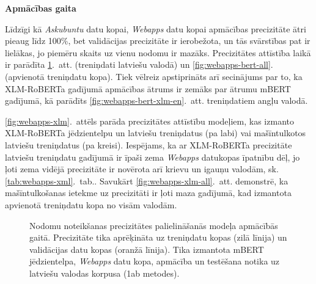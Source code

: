 \textbf{Apmācības gaita}

Līdzīgi kā \textit{Askubuntu} datu kopai, \textit{Webapps} datu kopai apmācības precizitāte ātri pieaug līdz 100\%, bet validācijas precizitāte ir ierobežota, un tās svārstības pat ir lielākas, jo piemēru skaits uz vienu nodomu ir mazāks. 
Precizitātes attīstība laikā ir parādīta \ref{fig:webapps-bert}.~att. (treniņdati latviešu valodā) un \ref{fig:webapps-bert-all}. (apvienotā treniņdatu kopa).
Tiek vēlreiz apstiprināts arī secinājums par to, ka XLM-RoBERTa gadījumā apmācības ātrums ir zemāks par ātrumu mBERT gadījumā, kā parādīts \ref{fig:webapps-bert-xlm-en}.~att. treniņdatiem angļu valodā.

\ref{fig:webapps-xlm}.~attēls parāda precizitātes attīstību modeļiem, kas izmanto XLM-RoBERTa jēdzientelpu un latviešu treniņdatus (pa labi) vai mašīntulkotos latviešu treniņdatus (pa kreisi).
Iespējams, ka ar XLM-RoBERTa precizitāte latviešu treniņdatu gadījumā ir īpaši zema \textit{Webapps} datukopas īpatnību dēļ, jo ļoti zema vidējā precizitāte ir novērota arī krievu un igauņu valodām, sk. \ref{tab:webapps-xml}.~tab..
Savukārt \ref{fig:webapps-xlm-all}.~att. demonstrē, ka mašīntulkošanas ietekme uz precizitāti ir ļoti maza gadījumā, kad izmantota apvienotā treniņdatu kopa no visām valodām.


\begin{figure}[h] 
   \centering
   \caption{Nodomu noteikšanas precizitātes palielināšanās modeļa apmācībās gaitā. Precizitāte tika aprēķināta uz treniņdatu kopas (zilā līnija) un validācijas datu kopas (oranžā līnija). Tika izmantota mBERT jēdzientelpa, \textit{Webapps} datu kopa, apmācība un testēšana notika uz latviešu valodas korpusa (1ab metodes).} 
   \label{fig:webapps-bert}
\end{figure}


